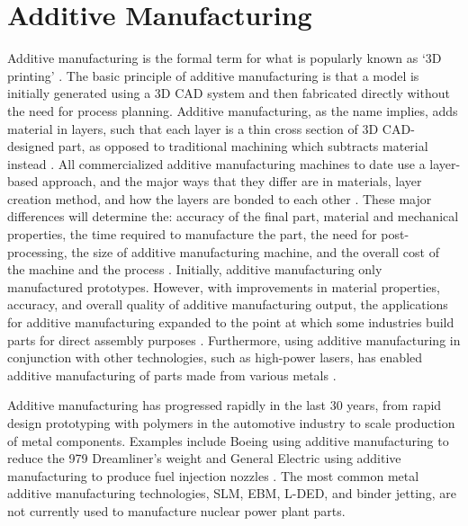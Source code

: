 \section{Additive Manufacturing}
Additive manufacturing is the formal term for what is popularly known as `3D printing' 
\cite{gibson_additive_2014}. 
The basic principle of additive manufacturing is that a model is initially generated using a
\gls{3D CAD} system and then fabricated directly without the need for process 
planning. 
Additive manufacturing, as the name implies, adds material in layers, such that 
each layer is a thin cross section of \gls{3D CAD}-designed part, as opposed 
to traditional machining which subtracts material instead 
\cite{standard_standard_2012}. 
All commercialized additive manufacturing machines to date use a layer-based approach, and 
the major ways that they differ are in materials, layer creation method, and 
how the layers are bonded to each other \cite{gibson_additive_2014}.
These major differences will determine the: accuracy of the 
final part, material and mechanical properties, the time required to manufacture 
the part, the need for post-processing, the size of additive manufacturing machine, and the overall 
cost of the machine and the process \cite{gibson_additive_2014}. 
Initially, additive manufacturing only manufactured prototypes. 
However, with improvements in material properties, accuracy, and overall quality 
of additive manufacturing output, the applications for additive manufacturing expanded to the 
point at which some industries build parts for direct assembly purposes
\cite{uriondo_present_2015}.  
Furthermore, using additive manufacturing in conjunction with other technologies, such as 
high-power lasers, has enabled additive manufacturing of parts made from various 
metals \cite{gibson_additive_2014}. 

Additive manufacturing has progressed rapidly in the last 30 years, from rapid 
design prototyping with polymers in the automotive industry to scale production 
of metal components.  
Examples include Boeing using additive manufacturing to reduce the 979 
Dreamliner's weight \cite{noauthor_printed_2017} and General Electric using 
additive manufacturing to produce fuel injection nozzles 
\cite{noauthor_transformation_2018}. 
The most common metal additive manufacturing technologies, \gls{SLM}, \gls{EBM}, 
\gls{L-DED}, and binder jetting, are not currently used to manufacture nuclear 
power plant parts. 

